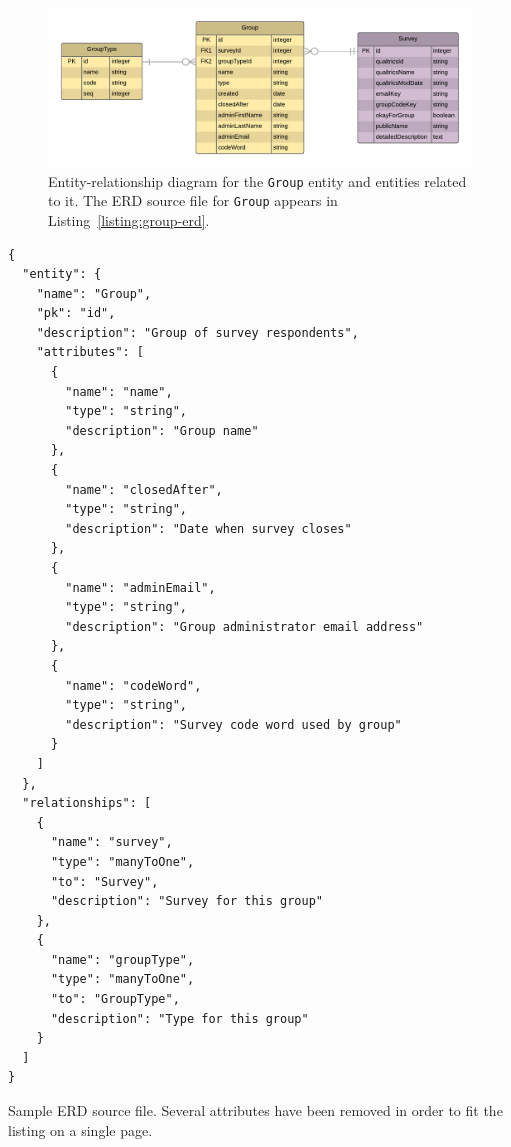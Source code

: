 \documentclass{article}
\begin{document}
\begin{figure}[h]
  \centering
  \includegraphics[width=\textwidth]{sample-erd}
  \caption{Entity-relationship diagram
    for the \texttt{Group}
    entity and entities related to it.
    The ERD source file for \texttt{Group}
    appears in Listing~\ref{listing:group-erd}.}
  \label{fig:erd}
\end{figure}

\begin{listing}
\begin{verbatim}
{
  "entity": {
    "name": "Group",
    "pk": "id",
    "description": "Group of survey respondents",
    "attributes": [
      {
        "name": "name",
        "type": "string",
        "description": "Group name"
      },
      {
        "name": "closedAfter",
        "type": "string",
        "description": "Date when survey closes"
      },
      {
        "name": "adminEmail",
        "type": "string",
        "description": "Group administrator email address"
      },
      {
        "name": "codeWord",
        "type": "string",
        "description": "Survey code word used by group"
      }
    ]
  },
  "relationships": [
    {
      "name": "survey",
      "type": "manyToOne",
      "to": "Survey",
      "description": "Survey for this group"
    },
    {
      "name": "groupType",
      "type": "manyToOne",
      "to": "GroupType",
      "description": "Type for this group"
    }
  ]
}
\end{verbatim}
\caption{Sample ERD source file.
Several attributes have been removed
in order to fit the listing on a single page.}
\label{listing:group-erd}
\end{listing}
\end{document}
